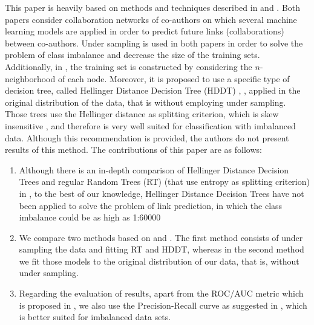 \documentclass{acm_proc_article-sp}
\begin{document}



This paper is heavily based on methods and techniques described in \cite{Hasan06linkprediction} and \cite{Lichtenwalter:2010:NPM:1835804.1835837}. Both papers consider collaboration networks of co-authors on which several machine learning models are applied in order to predict future links (collaborations) between co-authors. Under sampling is used in both papers in order to solve the problem of class imbalance and decrease the size of the training sets. Additionally, in \cite{Lichtenwalter:2010:NPM:1835804.1835837}, the training set is constructed by considering the $n$-neighborhood of each node. Moreover, it is proposed to use a specific type of decision tree, called Hellinger Distance Decision Tree (HDDT) \cite{Cieslak2008}, \cite{Cieslak2012}, applied in the original distribution of the data, that is without employing under sampling. Those trees use the Hellinger distance as splitting criterion, which is skew insensitive \cite{Cieslak2012}, and therefore is very well suited for classification with imbalanced data. Although this recommendation is provided, the authors do not present results of this method. The contributions of this paper are as follows:

\begin{enumerate}
	\item Although there is an in-depth comparison of Hellinger Distance Decision Trees and regular Random Trees (RT) (that use entropy as splitting criterion) in \cite{Cieslak2012}, to the best of our knowledge, Hellinger Distance Decision Trees have not been applied to solve the problem of link prediction, in which the class imbalance could be as high as 1:60000
	\item We compare two methods based on \cite{Hasan06linkprediction} and \cite{Lichtenwalter:2010:NPM:1835804.1835837}. The first method consists of under sampling the data and fitting RT and HDDT, whereas in the second method we fit those models to the original distribution of our data, that is, without under sampling.
	\item Regarding the evaluation of results, apart from the ROC/AUC metric which is proposed in \cite{Lichtenwalter:2010:NPM:1835804.1835837}, we also use the Precision-Recall curve as suggested in \cite{saito2015precision}, which is better suited for imbalanced data sets. 
\end{enumerate}
 
\end{document}
